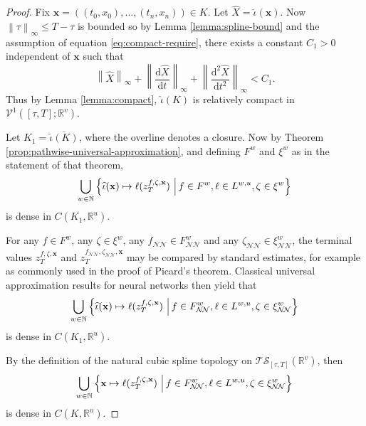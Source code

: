 \documentclass{article}
\theoremstyle{plain}
\theoremstyle{definition}
\newcommand{\ts}[2]{\mathcal{T\!S}_{#1}\left(#2\right)}
\newcommand{\norm}[1]{\left\|#1\right\|}
\newcommand{\reals}{\mathbb{R}}
\newcommand{\naturals}{\mathbb{N}}
\newcommand{\set}[2]{\left\{{#1}\,\left\vert\,{#2}\vphantom{{#1}}\right\}\right.}
\begin{document}
	\begin{proof}
	Fix $\mathbf{x} = ((t_0, x_0), \ldots, (t_n, x_n)) \in K$. Let $\widehat{X} = \widehat{\iota}(\mathbf{x})$. Now $\norm{\tau}_\infty \leq T - \tau$ is bounded so by Lemma \ref{lemma:spline-bound} and the assumption of equation \eqref{eq:compact-require}, there exists a constant $C_1 > 0$ independent of $\mathbf{x}$ such that
	\begin{equation*}
	\norm{\widehat{X}}_\infty + \norm{\frac{\mathrm{d}\widehat{X}}{\mathrm{d}t}}_\infty + \norm{\frac{\mathrm{d}^2\widehat{X}}{\mathrm{d}t^2}}_\infty < C_1.
	\end{equation*}
	Thus by Lemma \ref{lemma:compact}, $\widehat{\iota}(K)$ is relatively compact in $\mathcal{V}^1([\tau, T]; \reals^v)$.
	
	Let $K_1 = \overline{\widehat{\iota}(K)}$, where the overline denotes a closure. Now by Theorem \ref{prop:pathwise-universal-approximation}, and defining $F^w$ and $\xi^w$ as in the statement of that theorem,
	\begin{equation*}
	\bigcup_{w \in \naturals} \set{\widehat{\iota}(\mathbf{x}) \mapsto \ell(z^{f, \zeta, \mathbf{x}}_T)}{f \in F^w, \ell \in L^{w, u}, \zeta \in \xi^w}
	\end{equation*}
	is dense in $C(K_1, \reals^u)$.
	
	For any $f \in F^w$, any $\zeta \in \xi^w$, any $f_{\mathcal{N\!N}} \in F^w_{\mathcal{N\!N}}$ and any $\zeta_{\mathcal{N\!N}} \in \xi^w_{\mathcal{N\!N}}$, the terminal values $z_T^{f, \zeta, \mathbf{x}}$ and $z_T^{f_{\mathcal{N\!N}}, \zeta_{\mathcal{N\!N}}, \mathbf{x}}$ may be compared by standard estimates, for example as commonly used in the proof of Picard's theorem. Classical universal approximation results for neural networks \cite{pinkus, deepandnarrow} then yield that
	\begin{equation*}
	\bigcup_{w \in \naturals} \set{\widehat{\iota}(\mathbf{x}) \mapsto \ell(z^{f, \zeta, \mathbf{x}}_T)}{f \in F^w_{\mathcal{N\!N}}, \ell \in L^{w, u}, \zeta \in \xi^w_{\mathcal{N\!N}}}
	\end{equation*}
	is dense in $C(K_1, \reals^u)$.
	
	By the definition of the natural cubic spline topology on $\ts{[\tau, T]}{\reals^v}$, then
	\begin{equation*}
	\bigcup_{w \in \naturals} \set{\mathbf{x} \mapsto \ell(z^{f, \zeta, \mathbf{x}}_T)}{f \in F^w_{\mathcal{N\!N}}, \ell \in L^{w, u}, \zeta \in \xi^w_{\mathcal{N\!N}}}
	\end{equation*}
	is dense in $C(K, \reals^u)$.
	\end{proof}
	
\end{document}
